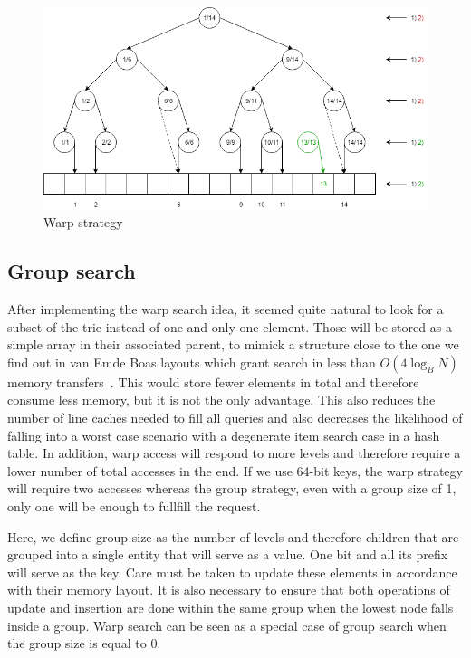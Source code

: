 \begin{figure}[!ht]
\centering
\includegraphics[width=\linewidth]{Chapters/XFastTries/Implementation/WarpStrategy.png} 
\caption{Warp strategy}
\end{figure}

\subsection{Group search}

After implementing the warp search idea, it seemed quite natural to look for a subset of the trie instead of one and only one element. Those will be stored as a simple array in their associated parent, to mimick a structure close to the one we find out in van Emde Boas layouts which grant search in less than $O(4 \log_{B} N)$ memory transfers~\cite{bender2005cache}. This would store fewer elements in total and therefore consume less memory, but it is not the only advantage. This also reduces the number of line caches needed to fill all queries and also decreases the likelihood of falling into a worst case scenario with a degenerate item search case in a hash table. In addition, warp access will respond to more levels and therefore require a lower number of total accesses in the end. If we use 64-bit keys, the warp strategy will require two accesses whereas the group strategy, even with a group size of 1, only one will be enough to fullfill the request.

Here, we define group size as the number of levels and therefore children that are grouped into a single entity that will serve as a value. One bit and all its prefix will serve as the key. Care must be taken to update these elements in accordance with their memory layout. It is also necessary to ensure that both operations of update and insertion are done within the same group when the lowest node falls inside a group. Warp search can be seen as a special case of group search when the group size is equal to 0.

